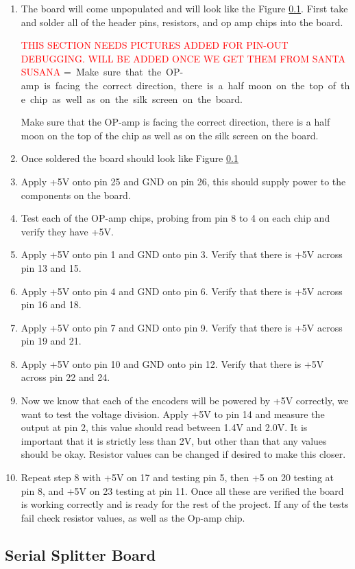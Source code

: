 \documentclass[12pt]{article}
\makeatletter
\newcommand{\mybox}[1]{%
  \setbox0=\hbox{#1}%
  \setlength{\@tempdima}{\dimexpr\wd0+13pt}%
  \begin{tcolorbox}[colframe=mycolor,boxrule=0.5pt,arc=4pt,
      left=6pt,right=6pt,top=6pt,bottom=6pt,boxsep=0pt,width=0.95\textwidth]
    #1
  \end{tcolorbox}
}
\makeatother
\begin{document}
\begin{enumerate}
	\item The board will come unpopulated and will look like the Figure \ref{}. First take and solder all of the header pins, resistors, and op amp chips into the board. 

\textcolor{red}{THIS SECTION NEEDS PICTURES ADDED FOR PIN-OUT DEBUGGING. WILL BE ADDED ONCE WE GET THEM FROM SANTA SUSANA}
\mybox{
Make sure that the OP-amp is facing the correct direction, there is a half moon on the top of the chip as well as on the silk screen on the board. 
}
	\item Once soldered the board should look like Figure \ref{}
	\item Apply +5V onto pin 25 and GND on pin 26, this should supply power to the components on the board.
	\item Test each of the OP-amp chips, probing from pin 8 to 4 on each chip and verify they have +5V.
	\item Apply +5V onto pin 1 and GND onto pin 3. Verify that there is +5V across pin 13 and 15.
	\item Apply +5V onto pin 4 and GND onto pin 6. Verify that there is +5V across pin 16 and 18.
	\item Apply +5V onto pin 7 and GND onto pin 9. Verify that there is +5V across pin 19 and 21.
	\item Apply +5V onto pin 10 and GND onto pin 12. Verify that there is +5V across pin 22 and 24.
	\item Now we know that each of the encoders will be powered by +5V correctly, we want to test the voltage division. Apply +5V to pin 14 and measure the output at pin 2, this value should read between 1.4V and 2.0V. It is important that it is strictly less than 2V, but other than that any values should be okay. Resistor values can be changed if desired to make this closer. 
	\item Repeat step 8 with +5V on 17 and testing pin 5, then +5 on 20 testing at pin 8, and +5V on 23 testing at pin 11. Once all these are verified the board is working correctly and is ready for the rest of the project. If any of the tests fail check resistor values, as well as the Op-amp chip.  
\end{enumerate}

\subsection{Serial Splitter Board}
\end{document}
